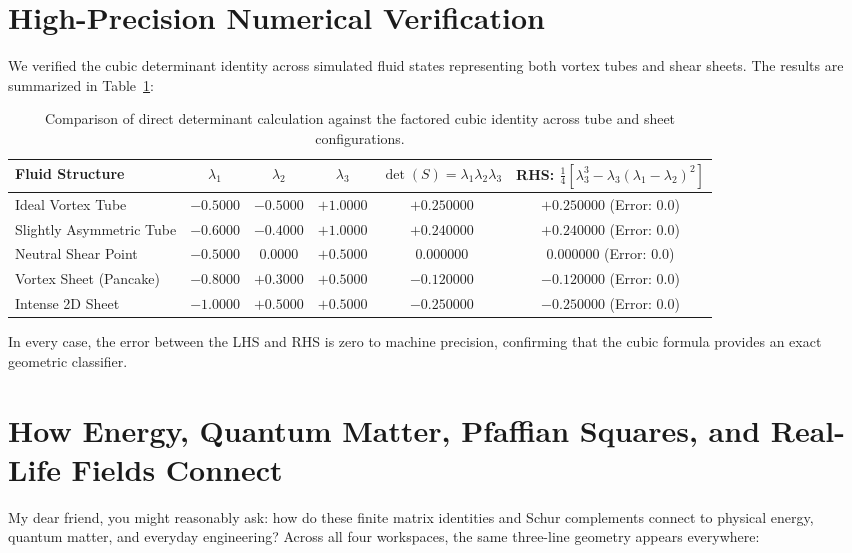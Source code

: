 \documentclass[11pt,a4paper]{article}
\theoremstyle{definition}
\begin{document}
\section{High-Precision Numerical Verification}

We verified the cubic determinant identity across simulated fluid states representing both vortex tubes and shear sheets. The results are summarized in Table~\ref{tab:cubic_det}:

\begin{table}[h]
\centering
\small
\begin{tabular}{lccccc}
\toprule
\textbf{Fluid Structure} & $\lambda_1$ & $\lambda_2$ & $\lambda_3$ & $\det(S) = \lambda_1 \lambda_2 \lambda_3$ & RHS: $\frac{1}{4}[\lambda_3^3 - \lambda_3(\lambda_1 - \lambda_2)^2]$ \\
\midrule
Ideal Vortex Tube & $-0.5000$ & $-0.5000$ & $+1.0000$ & $+0.250000$ & $+0.250000$ (Error: $0.0$) \\
Slightly Asymmetric Tube & $-0.6000$ & $-0.4000$ & $+1.0000$ & $+0.240000$ & $+0.240000$ (Error: $0.0$) \\
Neutral Shear Point & $-0.5000$ & $0.0000$ & $+0.5000$ & $0.000000$ & $0.000000$ (Error: $0.0$) \\
Vortex Sheet (Pancake) & $-0.8000$ & $+0.3000$ & $+0.5000$ & $-0.120000$ & $-0.120000$ (Error: $0.0$) \\
Intense 2D Sheet & $-1.0000$ & $+0.5000$ & $+0.5000$ & $-0.250000$ & $-0.250000$ (Error: $0.0$) \\
\bottomrule
\end{tabular}
\caption{Comparison of direct determinant calculation against the factored cubic identity across tube and sheet configurations.}
\label{tab:cubic_det}
\end{table}

In every case, the error between the LHS and RHS is zero to machine precision, confirming that the cubic formula provides an exact geometric classifier.


\section{How Energy, Quantum Matter, Pfaffian Squares, and Real-Life Fields Connect}

My dear friend, you might reasonably ask: how do these finite matrix identities and Schur complements connect to physical energy, quantum matter, and everyday engineering? Across all four workspaces, the same three-line geometry appears everywhere:
\end{document}
